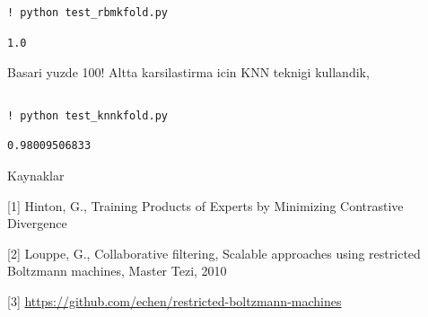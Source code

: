 \documentclass[12pt,fleqn]{article}\usepackage{../common}
\begin{document}
\begin{verbatim}
! python test_rbmkfold.py
\end{verbatim}

\begin{verbatim}
1.0
\end{verbatim}

Basari yuzde 100! Altta karsilastirma icin KNN teknigi kullandik,

\inputminted[fontsize=\footnotesize]{python}{test_knnkfold.py}

\begin{verbatim}
! python test_knnkfold.py
\end{verbatim}

\begin{verbatim}
0.98009506833
\end{verbatim}

Kaynaklar

[1] Hinton, G., Training Products of Experts by Minimizing Contrastive
Divergence

[2] Louppe, G., Collaborative filtering, Scalable approaches using
restricted Boltzmann machines, Master Tezi, 2010

[3] \url{https://github.com/echen/restricted-boltzmann-machines}
\end{document}
